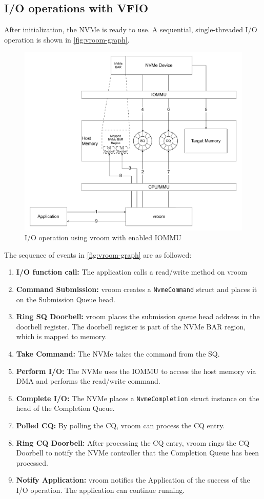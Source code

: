 \subsection{I/O operations with VFIO}
After initialization, the NVMe is ready to use. A sequential, single-threaded I/O operation is shown in \autoref{fig:vroom-graph}.
\begin{figure}[H]
    \centering
    \includegraphics[width=\textwidth]{figures/vroomdiagram.pdf}
    \caption{I/O operation using vroom with enabled IOMMU}
    \label{fig:vroom-graph}
\end{figure}
The sequence of events in \autoref{fig:vroom-graph} are as followed:
\begin{enumerate}
    \item \textbf{I/O function call:} The application calls a read/write method on vroom
    \item \textbf{Command Submission:} vroom creates a \texttt{NvmeCommand} struct and places it on the Submission Queue head.
    \item \textbf{Ring SQ Doorbell:} vroom places the submission queue head address in the doorbell register. The doorbell register is part of the NVMe BAR region, which is mapped to memory.
    \item \textbf{Take Command:} The NVMe takes the command from the SQ.
    \item \textbf{Perform I/O:} The NVMe uses the IOMMU to access the host memory via DMA and performs the read/write command.
    \item \textbf{Complete I/O:} The NVMe places a \texttt{NvmeCompletion} struct instance on the head of the Completion Queue.
    \item \textbf{Polled CQ:} By polling the CQ, vroom can process the CQ entry.
    \item \textbf{Ring CQ Doorbell:} After processing the CQ entry, vroom rings the CQ Doorbell to notify the NVMe controller that the Completion Queue has been processed.
    \item \textbf{Notify Application:} vroom notifies the Application of the success of the I/O operation. The application can continue running.
\end{enumerate}

